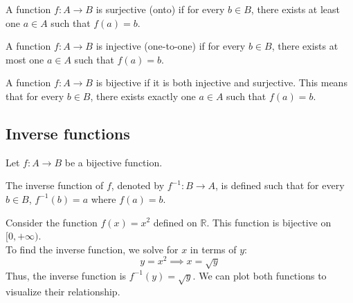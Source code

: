 \begin{definition}
    A function $f: A \to B$ is surjective (onto) if for every $b \in B$, there exists at least one $a \in A$ such that $f(a) = b$.
\end{definition}

\begin{definition}
    A function $f: A \to B$ is injective (one-to-one) if for every $b \in B$, there exists at most one $a \in A$ such that $f(a) = b$.
\end{definition}

\begin{definition}
    A function $f: A \to B$ is bijective if it is both injective and surjective. This means that for every $b \in B$, there exists exactly one $a \in A$ such that $f(a) = b$.
\end{definition}

\subsection{Inverse functions}
Let $f: A \to B$ be a bijective function.

\begin{definition}
    The inverse function of $f$, denoted by $f^{-1}: B \to A$, is defined such that for every $b \in B$, $f^{-1}(b) = a$ where $f(a) = b$.
\end{definition}

\begin{eg}
    Consider the function $f(x) = x^2$ defined on $\mathbb{R}$. This function is bijective on $[0, +\infty)$.
    \\
    To find the inverse function, we solve for $x$ in terms of $y$:
    \[
    y = x^2 \implies x = \sqrt{y}
    \]
    Thus, the inverse function is $f^{-1}(y) = \sqrt{y}$. We can plot both functions to visualize their relationship.
    \begin{center}
    \end{center}
\end{eg}